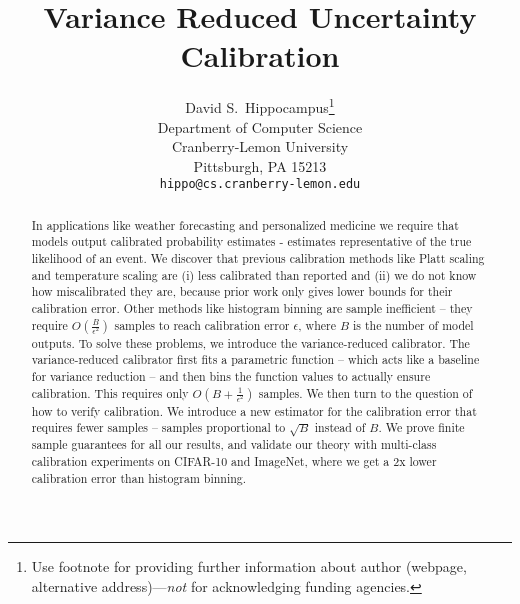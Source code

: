 \documentclass{article}
\title{Variance Reduced Uncertainty Calibration}
\author{%
  David S.~Hippocampus\thanks{Use footnote for providing further information
    about author (webpage, alternative address)---\emph{not} for acknowledging
    funding agencies.} \\
  Department of Computer Science\\
  Cranberry-Lemon University\\
  Pittsburgh, PA 15213 \\
  \texttt{hippo@cs.cranberry-lemon.edu} \\
}
\newcommand{\pl}[1]{\textcolor{red}{[PL: #1]}}
\begin{document}
\maketitle

\begin{abstract}
In applications like weather forecasting and personalized medicine we require that models output calibrated probability estimates - estimates representative of the true likelihood of an event. We discover that previous calibration methods like Platt scaling and temperature scaling are (i) less calibrated than reported and (ii) we do not know how miscalibrated they are, because prior work only gives lower bounds for their calibration error. Other methods like histogram binning are sample inefficient -- they require $O(\frac{B}{\epsilon^2})$ samples to reach calibration error $\epsilon$, where $B$ is the number of model outputs. To solve these problems, we introduce the variance-reduced calibrator. The variance-reduced calibrator first fits a parametric function -- which acts like a baseline for variance reduction -- and then bins the function values to actually ensure calibration. This requires only $O(B + \frac{1}{\epsilon^2})$ samples. We then turn to the question of how to verify calibration. We introduce a new estimator for the calibration error that requires fewer samples -- samples proportional to $\sqrt{B}$ instead of $B$. We prove finite sample guarantees for all our results, and validate our theory with multi-class calibration experiments on CIFAR-10 and ImageNet, where we get a 2x lower calibration error than histogram binning.
\end{abstract}
\end{document}
